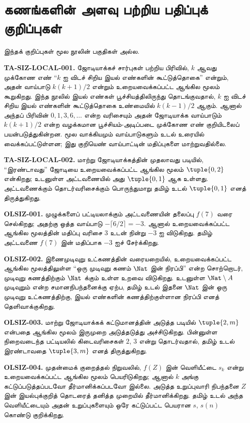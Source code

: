 \section*{கணங்களின் அளவு பற்றிய பதிப்புக் குறிப்புகள்}
இந்தக் குறிப்புகள் மூல நூலின் பகுதிகள் அல்ல.

\textbf{TA-SIZ-LOCAL-001.} ஜோடியாக்கச் சார்புகள் பற்றிய பிரிவில்,
$k$ ஆவது முக்கோண எண் “$k$ ஐ விடச் சிறிய இயல் எண்களின் கூட்டுத்தொகை”
என்றும், அதன் வாய்பாடு $k(k+1)/2$ என்றும் உறையவைக்கப்பட்ட ஆங்கில மூலம்
கூறுகிறது. இந்த நூலில் இயல் எண்கள் பூச்சியத்திலிருந்து தொடங்குவதால்,
$k$ ஐ விடச் சிறிய இயல் எண்களின் கூட்டுத்தொகை உண்மையில்
$k(k-1)/2$ ஆகும். ஆனால் அந்தப் பிரிவின் $0,1,3,6,\ldots$ என்ற
வரிசையும் அதன் ஜோடியாக்க வாய்பாடும் $k(k+1)/2$ என்ற
வழக்கமான பூச்சியம்-அடிப்படை முக்கோண எண் குறியிடலைப் பயன்படுத்துகின்றன.
மூல வாக்கியமும் வாய்பாடுகளும் உடல் உரையில் வைக்கப்பட்டுள்ளன;
இது குறியெண் வாய்பாட்டின் மதிப்புகளை மாற்றுவதில்லை.

\textbf{TA-SIZ-LOCAL-002.} மாற்று ஜோடியாக்கத்தின் முதலாவது படியில்,
“இரண்டாவது” ஜோடியை உறையவைக்கப்பட்ட ஆங்கில மூலம்
$\tuple{0,2}$ என்கிறது; உடனுள்ள அட்டவணையில் அது
$\tuple{0,1}$ ஆக உள்ளது. அட்டவணைக்கும் தொடர்வரிசைக்கும் பொருந்துமாறு
தமிழ் உடல் $\tuple{0,1}$ எனத் திருத்துகிறது.

\textbf{OLSIZ-001.} முழுக்களைப் பட்டியலாக்கும் அட்டவணையின் தலைப்பு
$f(7)$ வரை செல்கிறது; அதற்கு ஒத்த வாய்பாடு
$-\lceil 6/2\rceil=-3$. ஆனால் உறையவைக்கப்பட்ட ஆங்கில மூலத்தின்
மதிப்பு வரிசை $3$ உடன் நின்று $-3$ ஐ விடுகிறது.
தமிழ் அட்டவணை $f(7)$ இன் மதிப்பாக $-3$ ஐச் சேர்க்கிறது.

\textbf{OLSIZ-002.} இணைமுடிவுறு உட்கணத்தின் வரையறையில்,
உறையவைக்கப்பட்ட ஆங்கில மூலத்திலுள்ள “ஒரு முடிவுறு கணம் $\Nat$ இன்
நிரப்பி” என்ற சொற்றொடர், முடிவுறு கணத்திற்கும் $\Nat$ க்கும் உள்ள
உறவை விடுகிறது. உடனுள்ள $\Nat\setminus A$ முடிவுறும் என்ற
சமானநிபந்தனைக்கு ஏற்ப, தமிழ் உடல் இதனை $\Nat$ இன் ஒரு முடிவுறு
உட்கணத்திற்கு, இயல் எண்களின் கணத்திற்குள்ளான நிரப்பி எனத் தெளிவாக்குகிறது.

\textbf{OLSIZ-003.} மாற்று ஜோடியாக்கக் கட்டுமானத்தின் அடுத்த படியில்
$\tuple{2,m}$ என்பதை ஆங்கில மூலம் இருமுறை அடுத்தடுத்து அச்சிடுகிறது.
பின்னுள்ள நிறைவடைந்த பட்டியலில் கிடைவரிசைகள் $2$, $3$ என்று
தொடர்வதால், தமிழ் உடல் இரண்டாவதை $\tuple{3,m}$ எனத் திருத்துகிறது.

\textbf{OLSIZ-004.} முதன்மைக் குறைத்தல் நிறுவலில்,
$f(Z)$ இன் வெளியீட்டை $s_k$ என்று உறையவைக்கப்பட்ட ஆங்கில மூலம்
பெயரிடுகிறது; ஆனால் $k$ அங்கு கட்டுப்படுத்தப்படவோ தீர்மானிக்கப்படவோ
இல்லை. அடுத்த உறுப்புவாரி நிபந்தனை $Z$ இன் இயல்புக்குறித் தொடரைத்
தனித்த முறையில் தீர்மானிக்கிறது. தமிழ் உடல் அந்த வெளியீட்டையும் அதன்
உறுப்புகளையும் ஒரே கட்டுப்பட்ட பெயரான $s$, $s(n)$ கொண்டு குறிக்கிறது.

